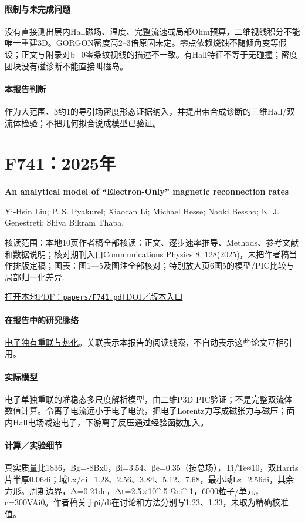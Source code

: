 \paragraph{限制与未完成问题}没有直接测出层内Hall磁场、温度、完整流速或局部Ohm预算，二维视线积分不能唯一重建3D。GORGON密度高2–3倍原因未定。零点依赖烧蚀不随倾角变等假设；正文与附录对b=0零条纹视线的描述不一致。有Hall特征不等于无碰撞；密度团块没有磁诊断不能直接叫磁岛。

\paragraph{本报告判断}作为大范围、β约1的导引场密度形态证据纳入，并提出带合成诊断的三维Hall/双流体检验；不把几何拟合说成模型已验证。

\section{F741：2025年}\label{paper:F741}

\textbf{An analytical model of “Electron-Only” magnetic reconnection rates}\citep{F741}\

Yi‐Hsin Liu;  P. S. Pyakurel;  Xiaocan Li;  Michael Hesse;  Naoki Bessho;  K. J. Genestreti;  Shiva Bikram Thapa.

\textsf{核读范围：}本地10页作者稿全部核读：正文、逐步速率推导、Methods、参考文献和数据说明；核对期刊入口Communications Physics 8, 128(2025)，未把作者稿当作排版定稿；\textsf{图表：}图1—5及图注全部核对；特别放大页6图5的模型/PIC比较与局部归一化差异.

\href{run:papers/F741.pdf}{打开本地PDF：\texttt{papers/F741.pdf}}\quad\href{https://doi.org/10.1038/s42005-025-02034-z}{DOI／版本入口}

\paragraph{在报告中的研究脉络}\hyperref[story:energy]{电子独有重联与热化}。关联表示本报告的阅读线索，不自动表示这些论文互相引用。

\paragraph{实际模型}电子单独重联的准稳态多尺度解析模型，由二维P3D PIC验证；不是完整双流体数值计算。令离子电流远小于电子电流，把电子Lorentz力写成磁张力与磁压；面内Hall电场减速电子，下游离子反压通过经验函数加入。

\paragraph{计算／实验细节}真实质量比1836，Bg=-8Bx0，βi=3.54、βe=0.35（按总场），Ti/Te≈10，双Harris片半厚0.06di；域Lx/di=1.28、2.56、3.84、5.12、7.68，最小域Lz=2.56di，其余方形。周期边界，Δ=0.21de，Δt=2.5×10\textasciicircum{}-5 Ωci\textasciicircum{}-1，6000粒子/单元，c=300VAi0。作者稿关于ρi/di在讨论和方法分别写1.23、1.33，未取为精确校准值。


